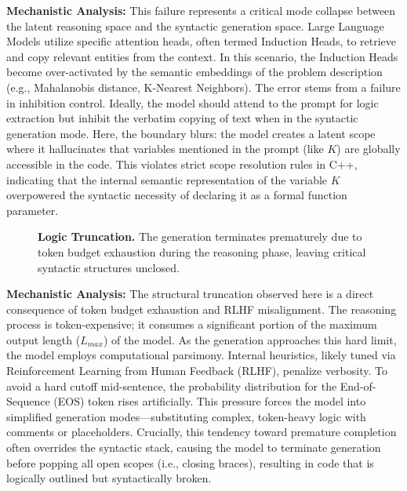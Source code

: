 \documentclass{article}
\theoremstyle{plain}
\theoremstyle{definition}
\theoremstyle{remark}
\begin{document}
\noindent \textbf{Mechanistic Analysis:} This failure represents a critical mode collapse between the latent reasoning space and the syntactic generation space. Large Language Models utilize specific attention heads, often termed Induction Heads, to retrieve and copy relevant entities from the context. In this scenario, the Induction Heads become over-activated by the semantic embeddings of the problem description (e.g., Mahalanobis distance, K-Nearest Neighbors). The error stems from a failure in inhibition control. Ideally, the model should attend to the prompt for logic extraction but inhibit the verbatim copying of text when in the syntactic generation mode. Here, the boundary blurs: the model creates a latent scope where it hallucinates that variables mentioned in the prompt (like $K$) are globally accessible in the code. This violates strict scope resolution rules in C++, indicating that the internal semantic representation of the variable $K$ overpowered the syntactic necessity of declaring it as a formal function parameter.

\begin{figure}[H]
    \centering
    \caption{\textbf{Logic Truncation.} The generation terminates prematurely due to token budget exhaustion during the reasoning phase, leaving critical syntactic structures unclosed.}
    \label{fig:doubao_error_3}
\end{figure}

\noindent \textbf{Mechanistic Analysis:} The structural truncation observed here is a direct consequence of token budget exhaustion and RLHF misalignment. The reasoning process is token-expensive; it consumes a significant portion of the maximum output length ($L_{max}$) of the model. As the generation approaches this hard limit, the model employs computational parsimony. Internal heuristics, likely tuned via Reinforcement Learning from Human Feedback (RLHF), penalize verbosity. To avoid a hard cutoff mid-sentence, the probability distribution for the End-of-Sequence (EOS) token rises artificially. This pressure forces the model into simplified generation modes—substituting complex, token-heavy logic with comments or placeholders. Crucially, this tendency toward premature completion often overrides the syntactic stack, causing the model to terminate generation before popping all open scopes (i.e., closing braces), resulting in code that is logically outlined but syntactically broken.
\end{document}
